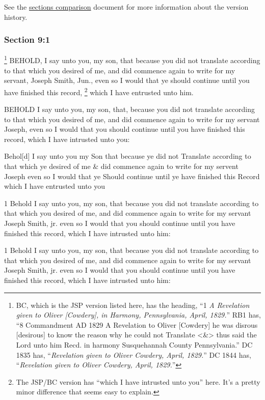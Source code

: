 		\medskip
		
		See the \href{https://drive.google.com/file/d/1goAvNz8jS4R8slYfMG_db55Ty2z_vmgK/view?usp=sharing}{sections comparison} document for more information about the version history.

	\subsubsection{Section 9:1} %
		\label{DC9-1}

			\footnote{%
				BC, which is the JSP version listed here, has the heading, ``1 \textit{A Revelation given to Oliver [Cowdery], in Harmony, Pennsylvania, April, 1829.}'' RB1 has, ``8 Commandment AD 1829 A Revelation to Oliver [Cowdery] he was disrous [desirous] to know the reason why he could not Translate <\&> thus said the Lord unto him Recd. in harmony Susquehannah County Pennsylvania.'' DC 1835 has, ``\textit{Revelation given to Oliver Cowdery, April, 1829.}'' DC 1844 has, ``\textit{Revelation given to Oliver Cowdery, April, 1829.}''
				}%
		BEHOLD, I say unto you, my son, that because you did not translate according to that which you desired of me, and did commence again to write for my servant, Joseph Smith, Jun., even so I would that ye should continue until you have finished this record,
			\footnote{%
				The JSP/BC version has ``which I have intrusted unto you'' here. It's a pretty minor difference that seems easy to explain.
				}%
		which I have entrusted unto him.

		\begin{framed}
		\scriptsize
			\begin{compactdesc}
				\item[JSP] BEHOLD I say unto you, my son, that, because you did not translate according to that which you desired of me, and did commence again to write for my servant Joseph, even so I would that you should continue until you have finished this record, which I have intrusted unto you:
				\item[RB1] Behol[d] I say unto you my Son that because ye did not Translate according to that which ye desired of me \& did commence again to write for my servent Joseph even so I would that ye Should continue until ye have finished this Record which I have entrusted unto you
				\item[DC 1835] 1 Behold I say unto you, my son, that because you did not translate according to that which you desired of me, and did commence again to write for my servant Joseph Smith, jr. even so I would that you should continue until you have finished this record, which I have intrusted unto him:
				\item[DC 1844] 1 Behold I say unto you, my son, that because you did not translate according to that which you desired of me, and did commence again to write for my servant Joseph Smith, jr. even so I would that you should continue until you have finished this record, which I have intrusted unto him: 
			\end{compactdesc}
		\end{framed}


